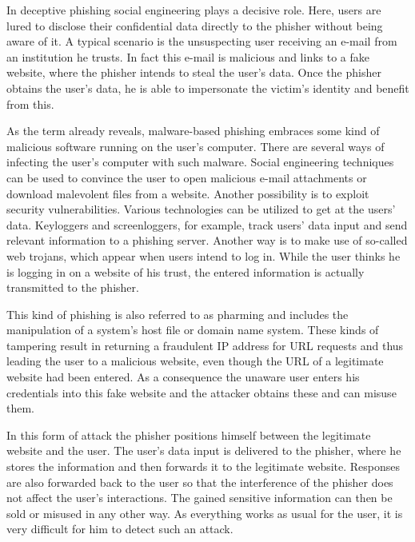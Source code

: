 \begin{description}[leftmargin=0cm]
	\item[Deceptive Phishing] In deceptive phishing social engineering plays a decisive role. Here, users are lured to disclose their confidential data directly to the phisher without being aware of it. A typical scenario is the unsuspecting user receiving an e-mail from an institution he trusts. In fact this e-mail is malicious and links to a fake website, where the phisher intends to steal the user's data. Once the phisher obtains the user's data, he is able to impersonate the victim's identity and benefit from this.
	\item[Malware-Based Phishing] As the term already reveals, malware-based phishing embraces some kind of malicious software running on the user's computer. There are several ways of infecting the user's computer with such malware. Social engineering techniques can be used to convince the user to open malicious e-mail attachments or download malevolent files from a website. Another possibility is to exploit security vulnerabilities. Various technologies can be utilized to get at the users' data. Keyloggers and screenloggers, for example, track users' data input and send relevant information to a phishing server. Another way is to make use of so-called web trojans, which appear when users intend to log in. While the user thinks he is logging in on a website of his trust, the entered information is actually transmitted to the phisher.
	\item[DNS Based Phishing] This kind of phishing is also referred to as pharming and includes the manipulation of a system's host file or domain name system. These kinds of tampering result in returning a fraudulent IP address for URL requests and thus leading the user to a malicious website, even though the URL of a legitimate website had been entered. As a consequence the unaware user enters his credentials into this fake website and the attacker obtains these and can misuse them.
	\item[Man-in-the-Middle Phishing] In this form of attack the phisher positions himself between the legitimate website and the user. The user's data input is delivered to the phisher, where he stores the information and then forwards it to the legitimate website. Responses are also forwarded back to the user so that the interference of the phisher does not affect the user's interactions. The gained sensitive information can then be sold or misused in any other way. As everything works as usual for the user, it is very difficult for him to detect such an attack. 

\end{description}
